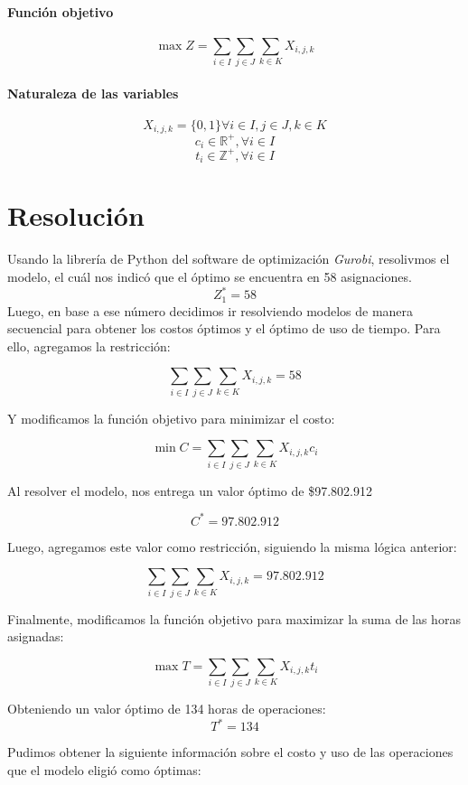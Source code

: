 \documentclass[a4paper,12pt]{book}
\begin{document}
 	\paragraph{Función objetivo}
 	
	$$\max Z = \sum_{i \in I} \sum_{j \in J} \sum_{k \in K} X_{i,j,k}$$

 	
 	\paragraph{Naturaleza de las variables}
 	
 	$$X_{i,j,k} = \{0,1\} \forall i \in I, j \in J, k \in K$$
 	$$c_i \in \mathbb{R}^+, \forall i \in I$$
 	$$t_i \in \mathbb{Z}^+, \forall i \in I$$
 	
 	\section{Resolución}
 	Usando la librería de Python del software de optimización \textit{Gurobi}, resolivmos el modelo, el cuál nos indicó que el óptimo se encuentra en 58 asignaciones.
 	$$Z_1^* = 58$$
 	Luego, en base a ese número decidimos ir resolviendo modelos de manera secuencial para obtener los costos óptimos y el óptimo de uso de tiempo. Para ello, agregamos la restricción: 
 	
 	$$\sum_{i \in I} \sum_{j \in J} \sum_{k \in K} X_{i,j,k} = 58$$
 	
 	Y modificamos la función objetivo para minimizar el costo:
 	
 	$$\min C = \sum_{i\in I} \sum_{j \in J} \sum_{k \in K} X_{i,j,k} c_i$$
 	
	Al resolver el modelo, nos entrega un valor óptimo de \$97.802.912
	
	$$C^* = 97.802.912$$
	
	Luego, agregamos este valor como restricción, siguiendo la misma lógica anterior:
	
	$$\sum_{i\in I} \sum_{j \in J} \sum_{k \in K} X_{i,j,k} = 97.802.912$$
	
	Finalmente, modificamos la función objetivo para maximizar la suma de las horas asignadas:
	
	$$\max T = \sum_{i\in I} \sum_{j \in J} \sum_{k \in K} X_{i,j,k} t_i$$
	
	Obteniendo un valor óptimo de 134 horas de operaciones:
	$$T^* = 134$$
	
	Pudimos obtener la siguiente información sobre el costo y uso de las operaciones que el modelo eligió como óptimas:
	
\end{document}
